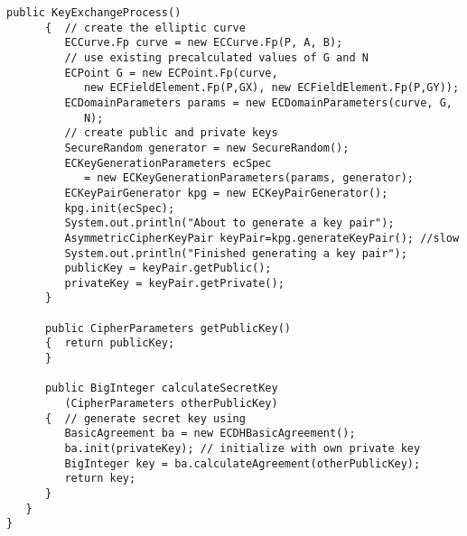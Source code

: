 \begin{lstlisting}[caption=ECC key exchange via the Bouncy Castle]
      public KeyExchangeProcess()
      {  // create the elliptic curve
         ECCurve.Fp curve = new ECCurve.Fp(P, A, B);
         // use existing precalculated values of G and N
         ECPoint G = new ECPoint.Fp(curve,
            new ECFieldElement.Fp(P,GX), new ECFieldElement.Fp(P,GY));
         ECDomainParameters params = new ECDomainParameters(curve, G,
            N);
         // create public and private keys
         SecureRandom generator = new SecureRandom();
         ECKeyGenerationParameters ecSpec
            = new ECKeyGenerationParameters(params, generator);
         ECKeyPairGenerator kpg = new ECKeyPairGenerator();
         kpg.init(ecSpec);
         System.out.println("About to generate a key pair");
         AsymmetricCipherKeyPair keyPair=kpg.generateKeyPair(); //slow
         System.out.println("Finished generating a key pair");
         publicKey = keyPair.getPublic();
         privateKey = keyPair.getPrivate();
      }

      public CipherParameters getPublicKey()
      {  return publicKey;
      }

      public BigInteger calculateSecretKey
         (CipherParameters otherPublicKey)
      {  // generate secret key using
         BasicAgreement ba = new ECDHBasicAgreement();
         ba.init(privateKey); // initialize with own private key
         BigInteger key = ba.calculateAgreement(otherPublicKey);
         return key;
      }
   }
}
\end{lstlisting}


